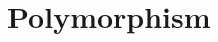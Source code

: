 \section{Polymorphism}


\newcommand{\bool}{\textsf{bool}}
\newcommand{\true}{\textsf{true}}
\newcommand{\false}{\textsf{false}}
\newcommand{\If}{\textsf{if}}
\newcommand{\definedAs}{\triangleq}
\newcommand{\FN}[1]{\Lambda {#1} .}
\newcommand{\Fun}[2]{\FN{#1}\,#2}

\newcommand{\tlToGamma}{\tau_\ell \rightarrow \gamma}
\newcommand{\trToGamma}{\tau_r \rightarrow \gamma}
\newcommand{\In}{\textsf{in}}
\newcommand{\case}{\textsf{case}}

\newcommand{\Lt}[3]{{\sf let}~{#1}:{#2} = {#3}~{\sf in}}
\newcommand{\Let}[4]{\Lt {#1} {#2} {#3}~{#4}}
\newcommand{\pair}{\textsf{pair}}
\newcommand{\nat}{\textsf{nat}}
\newcommand{\fst}{\textsf{fst}}
\newcommand{\snd}{\textsf{snd}}
\renewcommand{\pi}{\textsf{pi}}
\newcommand{\step}{\textsf{step}}
\newcommand{\R}{\textsf{R}}
\renewcommand{\succ}{\textsf{succ}}
\newcommand{\zero}{\textsf{zero}}


